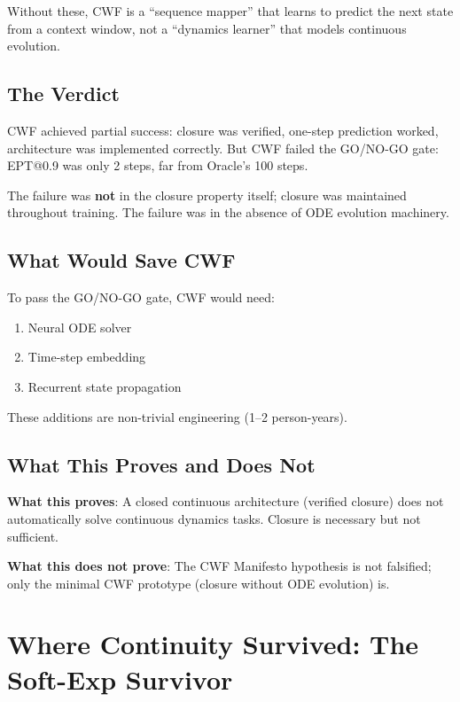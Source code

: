 \documentclass{article}
\begin{document}
Without these, CWF is a ``sequence mapper'' that learns to predict the next state from a context window, not a ``dynamics learner'' that models continuous evolution.

\subsection{The Verdict}

CWF achieved partial success: closure was verified, one-step prediction worked, architecture was implemented correctly. But CWF failed the GO/NO-GO gate: EPT@0.9 was only 2 steps, far from Oracle's 100 steps.

The failure was \textbf{not} in the closure property itself; closure was maintained throughout training. The failure was in the absence of ODE evolution machinery.

\subsection{What Would Save CWF}

To pass the GO/NO-GO gate, CWF would need:
\begin{enumerate}
    \item Neural ODE solver
    \item Time-step embedding
    \item Recurrent state propagation
\end{enumerate}

These additions are non-trivial engineering (1--2 person-years).

\subsection{What This Proves and Does Not}

\textbf{What this proves}: A closed continuous architecture (verified closure) does not automatically solve continuous dynamics tasks. Closure is necessary but not sufficient.

\textbf{What this does not prove}: The CWF Manifesto hypothesis is not falsified; only the minimal CWF prototype (closure without ODE evolution) is.

\section{Where Continuity Survived: The Soft-Exp Survivor}
\end{document}
